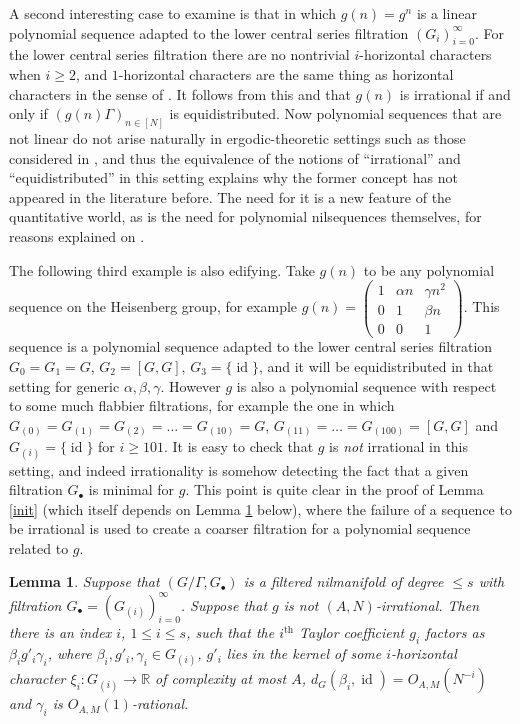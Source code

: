 \documentclass[11pt,reqno]{amsart}
\numberwithin{equation}{section}
\theoremstyle{plain}
\newtheorem{lemma}[subsection]{Lemma}
\theoremstyle{definition}
\renewcommand{\leq}{\leqslant}
\renewcommand{\geq}{\geqslant}
\newcommand\R{\mathbb{R}}
\newcommand\1{{\bf 1}}
\newcommand\2{{\bf 2}}
\newcommand\id{\operatorname{id}}
\begin{document}
A second interesting case to examine is that in which $g(n) = g^n$ is a linear polynomial sequence adapted to the lower central series filtration $(G_i)_{i = 0}^{\infty}$. For the lower central series filtration there are no nontrivial $i$-horizontal characters when $i \geq 2$, and $1$-horizontal characters are the same thing as horizontal characters in the sense of \cite[Definition 1.5]{green-tao-nilratner}. It follows from this and \cite[Theorem 1.16]{green-tao-nilratner} that $g(n)$ is irrational if and only if $(g(n)\Gamma)_{n \in [N]}$ is equidistributed. Now polynomial sequences that are not linear do not arise naturally in ergodic-theoretic settings such as those considered in \cite{bergelson-host-kra,leibman-orb-diag}, and thus the equivalence of the notions of ``irrational'' and ``equidistributed'' in this setting explains why the former concept has not appeared in the literature before.  The need for it is a new feature of the quantitative world, as is the need for polynomial nilsequences themselves, for reasons explained on \cite[\S 1]{green-tao-nilratner}.  

The following third example is also edifying. Take $g(n)$ to be any polynomial sequence on the Heisenberg group, for example $g(n) = \left( \begin{smallmatrix} 1 & \alpha n & \gamma n^2 \\ 0 & 1 & \beta n \\ 0 & 0 & 1 \end{smallmatrix}\right)$. This sequence is a polynomial sequence adapted to the lower central series filtration $G_0 = G_1 = G$, $G_2 = [G,G]$, $G_3 = \{\id\}$, and it will be equidistributed in that setting for generic $\alpha,\beta,\gamma$. However $g$ is also a polynomial sequence with respect to some much flabbier filtrations, for example the one in which $G_{(0)} = G_{(1)} = G_{(2)} = \dots = G_{(10)} = G$, $G_{(11)} = \dots = G_{(100)} = [G,G]$ and $G_{(i)} = \{ \id\}$ for $i \geq 101$. It is easy to check that $g$ is \emph{not} irrational in this setting, and indeed irrationality is somehow detecting the fact that a given filtration $G_{\bullet}$ is minimal for $g$. This point is quite clear in the proof of Lemma \ref{init} (which itself depends on Lemma \ref{short-factorisation} below), where the failure of a sequence to be irrational is used to create a coarser filtration for a polynomial sequence related to $g$.

\begin{lemma}\label{short-factorisation}
Suppose that $(G/\Gamma, G_{\bullet})$ is a filtered nilmanifold of degree $\leq s$ with filtration $G_{\bullet} = (G_{(i)})_{i=0}^\infty$. Suppose that $g$ is not $(A,N)$-irrational. Then there is an index $i$, $1 \leq i \leq s$, such that the $i^{\operatorname{th}}$ Taylor coefficient $g_i$ factors as $\beta_i g'_i \gamma_i$, where $\beta_i, g'_i, \gamma_i \in G_{(i)}$, $g'_i$ lies in the kernel of some $i$-horizontal character $\xi_i : G_{(i)} \rightarrow \R$ of complexity at most $A$, $d_G(\beta_i, \id) = O_{A,M}(N^{-i})$ and $\gamma_i$ is $O_{A,M}(1)$-rational.
\end{lemma}
\end{document}
